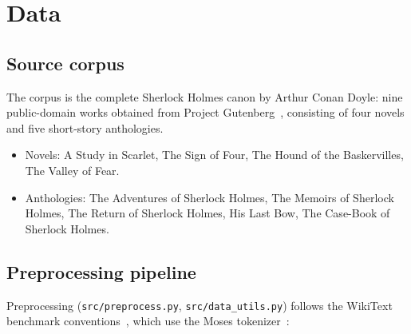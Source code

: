 \documentclass[11pt]{article}
\begin{document}
\section{Data}
\label{sec:data}

\subsection{Source corpus}

The corpus is the complete Sherlock Holmes canon by Arthur Conan Doyle: nine public-domain works obtained from Project Gutenberg~\cite{doyle}, consisting of four novels and five short-story anthologies.

\begin{itemize}
    \item Novels: {A Study in Scarlet}, {The Sign of Four},
    {The Hound of the Baskervilles}, {The Valley of Fear}.
    \item Anthologies: {The Adventures of Sherlock Holmes},
    {The Memoirs of Sherlock Holmes}, {The Return of Sherlock
    Holmes}, {His Last Bow}, {The Case-Book of Sherlock Holmes}.
\end{itemize}

\subsection{Preprocessing pipeline}

Preprocessing (\texttt{src/preprocess.py}, \texttt{src/data\_utils.py})
follows the WikiText benchmark conventions~\cite{merity2016}, which use
the Moses tokenizer~\cite{koehn2007}:
\end{document}
